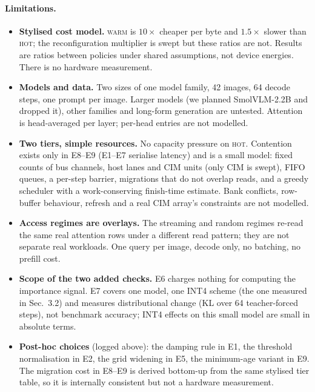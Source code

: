 \documentclass[10pt,a4paper]{article}
\newcommand{\hot}{\textsc{hot}}
\newcommand{\warm}{\textsc{warm}}
\begin{document}
\paragraph{Limitations.}
\begin{itemize}[leftmargin=1.2em]
\item \textbf{Stylised cost model.} \warm{} is $10\times$ cheaper per byte and $1.5\times$ slower than \hot{}; the reconfiguration multiplier is swept but these ratios are not. Results are ratios between policies under shared assumptions, not device energies. There is no hardware measurement.
\item \textbf{Models and data.} Two sizes of one model family, 42 images, 64 decode steps, one prompt per image. Larger models (we planned SmolVLM-2.2B and dropped it), other families and long-form generation are untested. Attention is head-averaged per layer; per-head entries are not modelled.
\item \textbf{Two tiers, simple resources.} No capacity pressure on \hot{}. Contention exists only in E8--E9 (E1--E7 serialise latency) and is a small model: fixed counts of bus channels, host lanes and CIM units (only CIM is swept), FIFO queues, a per-step barrier, migrations that do not overlap reads, and a greedy scheduler with a work-conserving finish-time estimate. Bank conflicts, row-buffer behaviour, refresh and a real CIM array's constraints are not modelled.
\item \textbf{Access regimes are overlays.} The streaming and random regimes re-read the same real attention rows under a different read pattern; they are not separate real workloads. One query per image, decode only, no batching, no prefill cost.
\item \textbf{Scope of the two added checks.} E6 charges nothing for computing the importance signal. E7 covers one model, one INT4 scheme (the one measured in Sec.~3.2) and measures distributional change (KL over 64 teacher-forced steps), not benchmark accuracy; INT4 effects on this small model are small in absolute terms.
\item \textbf{Post-hoc choices} (logged above): the damping rule in E1, the threshold normalisation in E2, the grid widening in E5, the minimum-age variant in E9. The migration cost in E8--E9 is derived bottom-up from the same stylised tier table, so it is internally consistent but not a hardware measurement.
\end{itemize}
\end{document}
